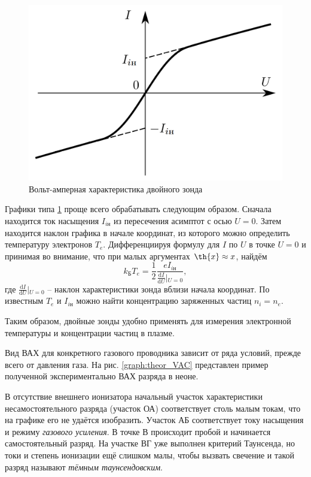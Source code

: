 \documentclass[a4paper, 12pt]{article}
\begin{document}
     \begin{figure}[H]
        \centering
        \includegraphics[width = 14 cm]{images/graph_cur.png}
        \caption{Вольт-амперная характеристика двойного зонда} 
        \label{theor_cur}
    \end{figure}

    Графики типа \ref{theor_cur} проще всего обрабатывать следующим образом. Сначала находится ток насыщения $I_{i\text{н}}$ из пересечения асимптот с осью $U = 0$. Затем находится наклон графика в начале координат, из которого можно определить температуру электронов $T_e$. Дифференциируя формулу для $I$ по $U$ в точке $U = 0$ и принимая во внимание, что при малых аргументах $\th{x}\approx x$, найдём \[k_{\text{Б}}T_e=\frac{1}{2}\frac{eI_{i\text{н}}}{\frac{\text{d}I}{\text{d}U}\vert{}_{U=0}},\] где $\frac{\text{d}I}{\text{d}U}\vert{}_{U=0}$ -- наклон характеристики зонда вблизи начала координат. По известным $T_e$ и $I_{i\text{н}}$ можно найти концентрацию заряженных частиц $n_i=n_e$.

    Таким образом, двойные зонды удобно применять для измерения электронной температуры и концентрации частиц в плазме.

    Вид ВАХ для конкретного газового проводника зависит от ряда условий, прежде всего от давления газа. На рис. \ref{graph:theor_VAC} представлен пример полученной экспериментально ВАХ разряда в неоне.
    
    В отсутствие внешнего ионизатора начальный участок характеристики несамостоятельного разряда (участок ОА) соответствует столь малым токам, что на графике его не удаётся изобразить. Участок АБ соответствует току насыщения и режиму \textit{газового усиления}. В точке В происходит пробой и начинается самостоятельный разряд. На участке ВГ уже выполнен критерий Таунсенда, но токи и степень ионизации ещё слишком малы, чтобы вызвать свечение и такой разряд называют \textit{тёмным таунсендовским}.
    
\end{document}
